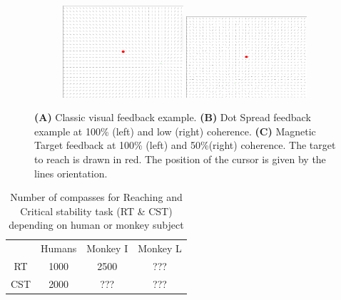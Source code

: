 \documentclass[preprint,12pt]{elsarticle}
\begin{document}
\begin{figure}[htbp]
\centering
\renewcommand{\thesubfigure}{\Alph{subfigure}}
\begin{subfigure}[b]{0.9\textwidth}
\caption{}
\end{subfigure}
\renewcommand{\thesubfigure}{\Alph{subfigure}}
\begin{subfigure}[b]{0.9\textwidth}
\caption{}
\end{subfigure}
\renewcommand{\thesubfigure}{\Alph{subfigure}}
\begin{subfigure}[b]{1\textwidth}
\caption{}
\includegraphics[width=0.49\textwidth,trim={7.5cm 4cm 2.5cm 2.5cm},clip]{images/MTcoherence100.pdf}
\includegraphics[width=0.49\textwidth,trim={2.5cm 0cm 7.5cm 5cm},clip]{images/MTcoherence50.pdf}
\end{subfigure}
\caption{\textbf{(A)} Classic visual feedback example. \textbf{(B)} Dot Spread feedback example at 100\% (left) and low (right) coherence. \textbf{(C)} Magnetic Target feedback at 100\% (left) and 50\%(right) coherence. The target to reach is drawn in red. The position of the cursor is given by the lines orientation.}
\label{fig:feedbacks}
\end{figure}

\begin{table}
\begin{center}
\begin{tabular}{ |c|c|c|c| } 
 \hline
  & Humans & Monkey I & Monkey L \\ 
 RT & 1000 & 2500 & ???\\ 
 CST & 2000 & ??? & ???\\ 
 \hline
\end{tabular}
\end{center}
\caption{Number of compasses for Reaching and Critical stability task (RT \& CST) depending on human or monkey subject}
\label{table:lines}
\end{table}
\end{document}
